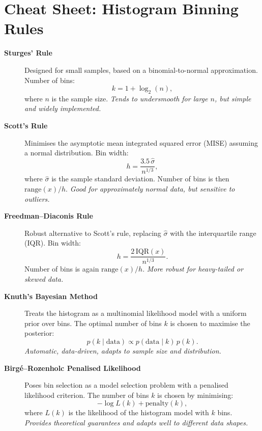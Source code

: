 \section*{Cheat Sheet: Histogram Binning Rules}

\begin{description}

  \item[\textbf{Sturges' Rule} \cite{sturges1926}]  
  Designed for small samples, based on a binomial-to-normal approximation.  
  Number of bins:
  \[
    k = 1 + \log_{2}(n),
  \]
  where $n$ is the sample size.  
  \emph{Tends to undersmooth for large $n$, but simple and widely implemented.}

  \item[\textbf{Scott's Rule} \cite{scott1979}]  
  Minimises the asymptotic mean integrated squared error (MISE) assuming a normal distribution.  
  Bin width:
  \[
    h = \frac{3.5 \, \hat{\sigma}}{n^{1/3}},
  \]
  where $\hat{\sigma}$ is the sample standard deviation.  
  Number of bins is then $\text{range}(x) / h$.  
  \emph{Good for approximately normal data, but sensitive to outliers.}

  \item[\textbf{Freedman--Diaconis Rule} \cite{freedman1981}]  
  Robust alternative to Scott’s rule, replacing $\hat{\sigma}$ with the interquartile range (IQR).  
  Bin width:
  \[
    h = \frac{2 \, \mathrm{IQR}(x)}{n^{1/3}}.
  \]
  Number of bins is again $\text{range}(x) / h$.  
  \emph{More robust for heavy-tailed or skewed data.}

  \item[\textbf{Knuth’s Bayesian Method} \cite{knuth2006}]  
  Treats the histogram as a multinomial likelihood model with a uniform prior over bins.  
  The optimal number of bins $k$ is chosen to maximise the posterior:
  \[
    p(k \mid \text{data}) \propto p(\text{data} \mid k) \, p(k).
  \]
  \emph{Automatic, data-driven, adapts to sample size and distribution.}

  \item[\textbf{Birg{\'e}--Rozenholc Penalised Likelihood} \cite{birge2006}]  
  Poses bin selection as a model selection problem with a penalised likelihood criterion.  
  The number of bins $k$ is chosen by minimising:
  \[
    -\log L(k) + \text{penalty}(k),
  \]
  where $L(k)$ is the likelihood of the histogram model with $k$ bins.  
  \emph{Provides theoretical guarantees and adapts well to different data shapes.}

\end{description}


